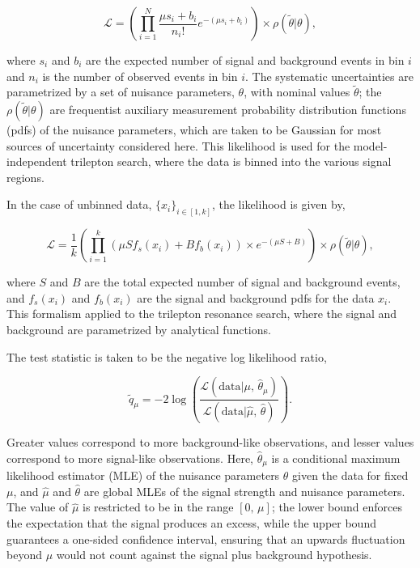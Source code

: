 \begin{appendices}
\begin{equation}\label{eqn:binned-likelihood}
	\mathcal{L} = \left(\prod_{i=1}^N \frac{\mu s_i + b_i}{n_i!} e^{-(\mu s_i + b_i)}\right) \times \rho(\tilde{\theta}|\theta),
\end{equation}

where $s_i$ and $b_i$ are the expected number of signal and background events in bin $i$ and $n_i$ is the number of observed events in bin $i$. The systematic uncertainties are parametrized by a set of nuisance parameters, $\theta$, with nominal values $\tilde{\theta}$; the $\rho(\tilde{\theta}|\theta)$ are frequentist auxiliary measurement probability distribution functions (pdfs) of the nuisance parameters, which are taken to be Gaussian for most sources of uncertainty considered here. This likelihood is used for the model-independent trilepton search, where the data is binned into the various signal regions.

In the case of unbinned data, $\{x_i\}_{i\in [1,k]}$, the likelihood is given by,

\begin{equation}\label{eqn:unbinned-likelihood}
	\mathcal{L}=\frac1k \left(\prod_{i=1}^{k} \left(\mu S f_s(x_i) + B f_b(x_i)\right) \times e^{-(\mu S + B)}\right) \times \rho(\tilde{\theta}|\theta),
\end{equation}

where $S$ and $B$ are the total expected number of signal and background events, and $f_s(x_i)$ and $f_b(x_i)$ are the signal and background pdfs for the data $x_i$. This formalism applied to the trilepton resonance search, where the signal and background are parametrized by analytical functions. 

The test statistic is taken to be the negative log likelihood ratio,

\begin{equation}\label{eqn:NLLR}
  \tilde{q}_{\mu} = -2\log \left(\frac{\mathcal{L}(\mathrm{data}|\mu,\,\hat{\theta}_{\mu})}{\mathcal{L}(\mathrm{data}|\hat{\mu},\,\hat{\theta})}\right).
\end{equation}

Greater values correspond to more background-like observations, and lesser values correspond to more signal-like observations. Here, $\hat{\theta}_{\mu}$ is a conditional maximum likelihood estimator (MLE) of the nuisance parameters $\theta$ given the data for fixed $\mu$, and $\hat{\mu}$ and $\hat{\theta}$ are global MLEs of the signal strength and nuisance parameters. The value of $\hat{\mu}$ is restricted to be in the range $[0,\,\mu]$; the lower bound enforces the expectation that the signal produces an excess, while the upper bound guarantees a one-sided confidence interval, ensuring that an upwards fluctuation beyond $\mu$ would not count against the signal plus background hypothesis. 


\end{appendices}
